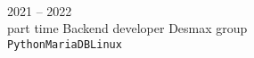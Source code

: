 \documentclass[9pt]{developercv} %
\begin{document}
\vspace{0.5cm}



\begin{minipage}[t]{0.4\textwidth} %
	\vspace{-\baselineskip} %
	
	\lorem \lorem \lorem \lorem \lorem\\ %
\end{minipage}
\hfill %
\begin{minipage}[t]{0.5\textwidth} %
	\vspace{-\baselineskip} %
	\begin{barchart}{5.5}


	\end{barchart}
\end{minipage}

\begin{center}
\end{center}



\begin{entrylist}

	\entry
		{2021 -- 2022\\\footnotesize{part time}}
		{Backend developer}
		{Desmax group}
		{\lorem\lorem\\ \texttt{Python}\slashsep\texttt{MariaDB}\slashsep\texttt{Linux}}
\end{entrylist}

\end{document}
